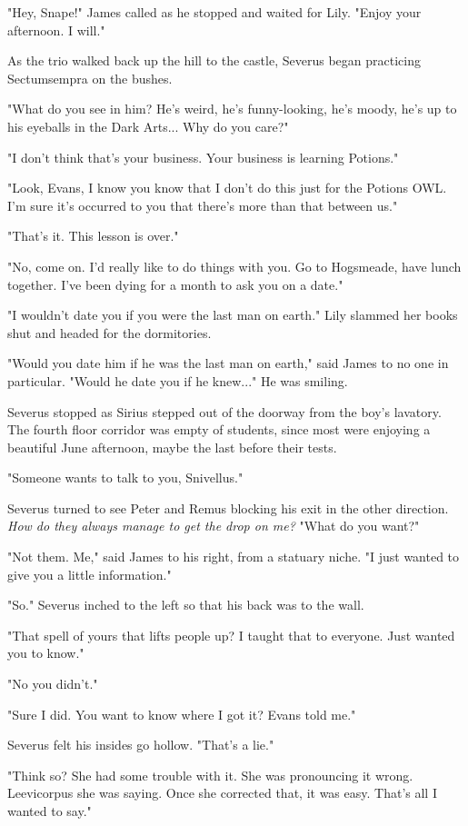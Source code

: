 \documentclass[a4paper,11pt]{article}
\begin{document}
"Hey, Snape!" James called as he stopped and waited for Lily. "Enjoy your afternoon. I will."

As the trio walked back up the hill to the castle, Severus began practicing Sectumsempra on the bushes.

"What do you see in him? He's weird, he's funny-looking, he's moody, he's up to his eyeballs in the Dark Arts... Why do you care?"

"I don't think that's your business. Your business is learning Potions."

"Look, Evans, I know you know that I don't do this just for the Potions OWL. I'm sure it's occurred to you that there's more than that between us."

"That's it. This lesson is over."

"No, come on. I'd really like to do things with you. Go to Hogsmeade, have lunch together. I've been dying for a month to ask you on a date."

"I wouldn't date you if you were the last man on earth." Lily slammed her books shut and headed for the dormitories.

"Would you date him if he was the last man on earth," said James to no one in particular. "Would he date you if he knew..." He was smiling.

Severus stopped as Sirius stepped out of the doorway from the boy's lavatory. The fourth floor corridor was empty of students, since most were enjoying a beautiful June afternoon, maybe the last before their tests.

"Someone wants to talk to you, Snivellus."

Severus turned to see Peter and Remus blocking his exit in the other direction. \emph{How do they always manage to get the drop on me?} "What do you want?"

"Not them. Me," said James to his right, from a statuary niche. "I just wanted to give you a little information."

"So." Severus inched to the left so that his back was to the wall.

"That spell of yours that lifts people up? I taught that to everyone. Just wanted you to know."

"No you didn't."

"Sure I did. You want to know where I got it? Evans told me."

Severus felt his insides go hollow. "That's a lie."

"Think so? She had some trouble with it. She was pronouncing it wrong. Leevicorpus she was saying. Once she corrected that, it was easy. That's all I wanted to say."
\end{document}
